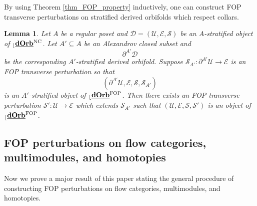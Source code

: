 \documentclass[reqno, 10pt]{amsart}
\numberwithin{equation}{section}
\numberwithin{equation}{section}
\renewcommand{\subset}{\subseteq}
\newtheorem{lemma}[thm]{Lemma}
\theoremstyle{definition}
\theoremstyle{remark}
\newcommand{\beqn}{\begin{equation*}}
\newcommand{\eeqn}{\end{equation*}}
\newcommand{\mc}{\mathcal}
\renewcommand{\outer}{{}_{\lfloor}}
\newcommand{\uds}[1]{\underline{\smash{#1}}}
\begin{document}
By using Theorem \ref{thm_FOP_property} inductively, one can construct FOP transverse perturbations on stratified derived orbifolds which respect collars. 


\begin{lemma}\label{lemma_FOP_induction}
Let $A$ be a regular poset and ${\mc D} = ({\mc U}, {\mc E}, {\mc S})$ be an $A$-stratified object of $\outer \uds{\bf dOrb}^{\rm NC}$. Let $A' \subset A$ be an Alexandrov closed subset and 
\beqn
\partial^{A'} {\mc D}
\eeqn
be the corresponding $A'$-stratified derived orbifold. Suppose ${\mc S}_{A'}: \partial^{A'} {\mc U} \to {\mc E}$ is an FOP transverse perturbation so that 
\beqn
(\partial^{A'} {\mc U}, {\mc E}, {\mc S}, {\mc S}_{A'})
\eeqn
is an $A'$-stratified object of $\outer \uds{\bf dOrb}^{\rm FOP}$. Then there exists an FOP transverse perturbation ${\mc S}': {\mc U} \to {\mc E}$ which extends ${\mc S}_{A'}$ such that $({\mc U}, {\mc E}, {\mc S}, {\mc S}')$ is an object of $\outer \uds{\bf dOrb}^{\rm FOP}$. 
\end{lemma}





\subsection{FOP perturbations on flow categories, multimodules, and homotopies}

Now we prove a major result of this paper stating the general procedure of constructing FOP perturbations on flow categories, multimodules, and homotopies. 
\end{document}
